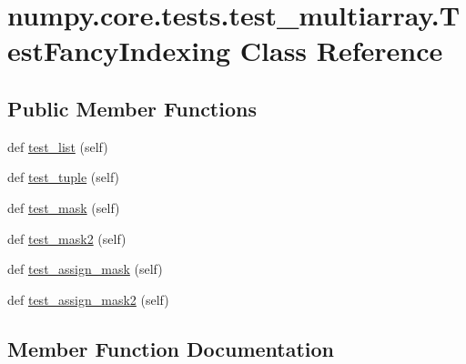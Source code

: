 \hypertarget{classnumpy_1_1core_1_1tests_1_1test__multiarray_1_1TestFancyIndexing}{}\section{numpy.\+core.\+tests.\+test\+\_\+multiarray.\+Test\+Fancy\+Indexing Class Reference}
\label{classnumpy_1_1core_1_1tests_1_1test__multiarray_1_1TestFancyIndexing}
\subsection*{Public Member Functions}
\begin{DoxyCompactItemize}
\item 
def \hyperlink{classnumpy_1_1core_1_1tests_1_1test__multiarray_1_1TestFancyIndexing_acbc297762e8cc370cf1e8caa409fdf08}{test\+\_\+list} (self)
\item 
def \hyperlink{classnumpy_1_1core_1_1tests_1_1test__multiarray_1_1TestFancyIndexing_a645d0af31341ea6fc2fdfc72dc219501}{test\+\_\+tuple} (self)
\item 
def \hyperlink{classnumpy_1_1core_1_1tests_1_1test__multiarray_1_1TestFancyIndexing_a35d81f3e3f3adb7e0295b30f9c9884a8}{test\+\_\+mask} (self)
\item 
def \hyperlink{classnumpy_1_1core_1_1tests_1_1test__multiarray_1_1TestFancyIndexing_a7790bc63d4e7a817cc1ed0bb957c6227}{test\+\_\+mask2} (self)
\item 
def \hyperlink{classnumpy_1_1core_1_1tests_1_1test__multiarray_1_1TestFancyIndexing_a637c13f3c666b8dd03fb733799495eec}{test\+\_\+assign\+\_\+mask} (self)
\item 
def \hyperlink{classnumpy_1_1core_1_1tests_1_1test__multiarray_1_1TestFancyIndexing_ae81d145e02c6e29f690756a5ea114f21}{test\+\_\+assign\+\_\+mask2} (self)
\end{DoxyCompactItemize}


\subsection{Member Function Documentation}
\mbox{\label{classnumpy_1_1core_1_1tests_1_1test__multiarray_1_1TestFancyIndexing_a637c13f3c666b8dd03fb733799495eec}} 
